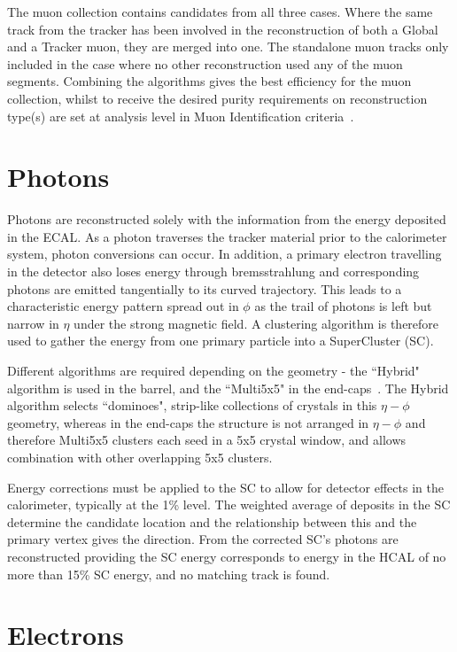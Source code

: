 The muon collection contains candidates from all three cases. Where the same track from the tracker has been involved in the reconstruction of both a Global and a Tracker muon, they are merged into one.  The standalone muon tracks only included in the case where no other reconstruction used any of the muon segments. Combining the algorithms gives the best efficiency for the muon collection, whilst to receive the desired purity requirements on reconstruction type(s) are set at analysis level in Muon Identification criteria~\cite{MUO-10-004}. 

\section{Photons}

Photons are reconstructed solely with the information from the energy deposited in the ECAL. As a photon traverses the tracker material prior to the calorimeter system, photon conversions can occur.  In addition, a primary electron travelling in the detector also loses energy through bremsstrahlung and corresponding photons are emitted tangentially to its curved trajectory. This leads to a characteristic energy pattern spread out in $\phi$ as the trail of photons is left but narrow in $\eta$ under the strong magnetic field. A clustering algorithm is therefore used to gather the energy from one primary particle into a SuperCluster (SC).

 Different algorithms are required depending on the geometry - the ``Hybrid" algorithm is used in the barrel, and the ``Multi5x5" in the end-caps~\cite{EGM-10-005}. The Hybrid algorithm selects ``dominoes", strip-like collections of crystals in this $\eta - \phi$ geometry, whereas in the end-caps the structure is not arranged in $\eta - \phi$ and therefore Multi5x5 clusters each seed in a 5x5 crystal window, and allows combination with other overlapping 5x5 clusters.

Energy corrections must be applied to the SC to allow for detector effects in the calorimeter, typically at the 1\% level. The weighted average of deposits in the SC determine the candidate location and the relationship between this and the primary vertex gives the direction. From the corrected SC's photons are reconstructed providing the SC energy corresponds to energy in the HCAL of no more than 15\% SC energy, and no matching track is found. 

\section{Electrons}

